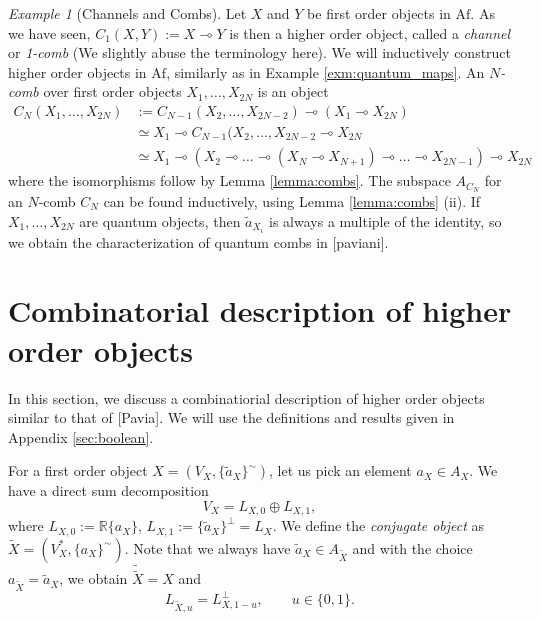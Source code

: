 \documentclass[12pt]{article}
\theoremstyle{definition}
\theoremstyle{remark}
\newtheorem{exm}{Example}
\def \Af{\mathrm{Af}}
\begin{document}
\begin{exm}[Channels and Combs] Let  $X$ and $Y$ be first order objects in $\Af$. As we
have seen, $C_1(X,Y):= X\multimap Y$ is then a higher order object, called a {\em channel} or {\em
1-comb} (We slightly  abuse
the terminology here).  We will inductively construct higher order objects in $\Af$,
similarly as in Example \ref{exm:quantum_maps}. An
{\em $N$-comb} over first order objects $X_1,\dots,X_{2N}$ is an object
\begin{align*}
C_N(X_1,\dots,X_{2N})&:=C_{N-1}(X_2,\dots,X_{2N-2})\multimap (X_1\multimap X_{2N})\\
&\simeq X_{1}\multimap C_{N-1}(X_2,\dots,X_{2N-2}\multimap X_{2N}\\
&\simeq X_1\multimap(X_2\multimap\dots \multimap (X_{N}\multimap
X_{N+1})\multimap \dots \multimap X_{2N-1})  \multimap X_{2N}
\end{align*}
where the isomorphisms follow by Lemma \ref{lemma:combs}. The subspace $A_{C_N}$ for an
$N$-comb $C_N$ can be found inductively, using Lemma \ref{lemma:combs} (ii).
If $X_1,\dots, X_{2N}$ are quantum objects, then $\tilde a_{X_i}$ is always a multiple of
the identity, so we obtain the characterization of quantum combs  in [paviani].



\end{exm}




\section{Combinatorial description of higher order objects}

In this section, we discuss a combinatiorial description of higher order objects similar
to that of [Pavia]. We will use the definitions and results given in Appendix
\ref{sec:boolean}.

For a first order object $X=(V_X, \{\tilde a_X\}^\sim)$, let us pick an element $a_X\in
A_X$. We have a direct sum decomposition
\[
V_X=L_{X,0}\oplus L_{X,1},
\]
where $L_{X,0}:= \mathbb R\{a_X\}$, $L_{X,1}:=\{\tilde a_X\}^\perp=L_X$.
We define the {\em conjugate object}  as $\tilde X=(V_X^*,\{a_X\}^\sim)$. Note that we always
have $\tilde a_X\in A_{\tilde X}$ and with the choice $a_{\tilde X}=\tilde a_X$, we obtain 
$\tilde{\tilde X}=X$ and 
\begin{equation}\label{eq:complement}
L_{\tilde X,u}=L_{X,1-u}^\perp,\qquad u\in \{0,1\}.
\end{equation}
\end{document}

